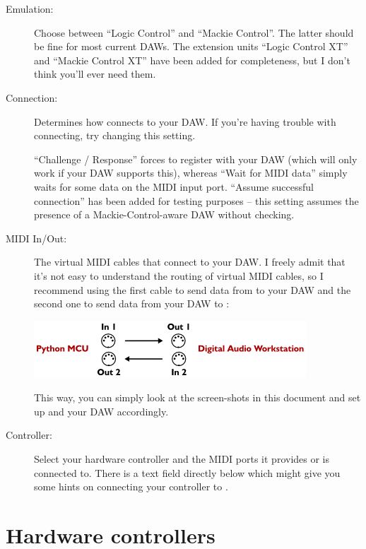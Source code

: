 \begin{description}
\item[Emulation:] Choose between ``Logic Control'' and ``Mackie
  Control''.  The latter should be fine for most current DAWs.  The
  extension units ``Logic Control XT'' and ``Mackie Control XT'' have
  been added for completeness, but I don't think you'll ever need
  them.

\item[Connection:] Determines how  connects to
  your DAW.  If you're having trouble with connecting, try changing
  this setting.

  ``Challenge / Response'' forces  to register
  with your DAW (which will only work if your DAW supports this),
  whereas ``Wait for MIDI data'' simply waits for some data on the
  MIDI input port.  ``Assume successful connection'' has been added
  for testing purposes -- this setting assumes the presence of a
  Mackie-Control-aware DAW without checking.

\item[MIDI In/Out:] The virtual MIDI cables that connect
   to your DAW.  I freely admit that it's not
  easy to understand the routing of virtual MIDI cables, so I
  recommend using the first cable to send data from
   to your DAW and the second one to send data
  from your DAW to :

  \includegraphics[scale=\screenshotscale,clip]{include/images/virtual_midi_cables.png}

  This way, you can simply look at the screen-shots in this document
  and set up  and your DAW accordingly.

\item[Controller:] Select your hardware controller and the MIDI ports
  it provides or is connected to.  There is a text field directly
  below which might give you some hints on connecting your controller
  to .

\end{description}

\chapter{Hardware controllers}
\label{chap:controller_setup}

